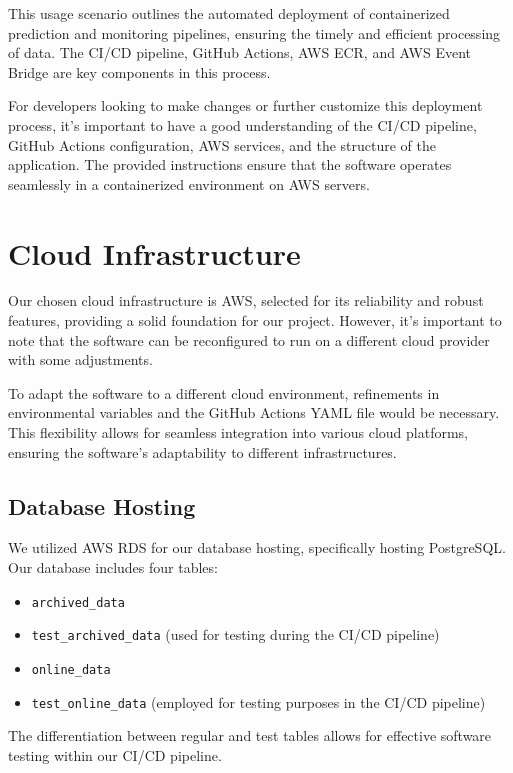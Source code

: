 \documentclass{report}
\begin{document}
This usage scenario outlines the automated deployment of containerized prediction and monitoring pipelines, ensuring the timely and efficient processing of data. The CI/CD pipeline, GitHub Actions, AWS ECR, and AWS Event Bridge are key components in this process.

For developers looking to make changes or further customize this deployment process, it's important to have a good understanding of the CI/CD pipeline, GitHub Actions configuration, AWS services, and the structure of the application. The provided instructions ensure that the software operates seamlessly in a containerized environment on AWS servers.

\chapter{Cloud Infrastructure}\label{chap:cloud-infrastructure}

Our chosen cloud infrastructure is AWS, selected for its reliability and robust features, providing a solid foundation for our project. However, it's important to note that the software can be reconfigured to run on a different cloud provider with some adjustments.

To adapt the software to a different cloud environment, refinements in environmental variables and the GitHub Actions YAML file would be necessary. This flexibility allows for seamless integration into various cloud platforms, ensuring the software's adaptability to different infrastructures.

\section{Database Hosting}

We utilized AWS RDS for our database hosting, specifically hosting PostgreSQL. Our database includes four tables:

\begin{itemize}
    \item \texttt{archived\_data}
    \item \texttt{test\_archived\_data} (used for testing during the CI/CD pipeline)
    \item \texttt{online\_data}
    \item \texttt{test\_online\_data} (employed for testing purposes in the CI/CD pipeline)
\end{itemize}

The differentiation between regular and test tables allows for effective software testing within our CI/CD pipeline.
\end{document}
